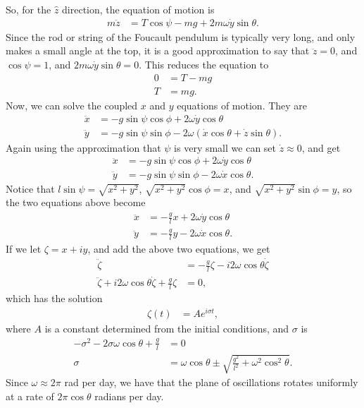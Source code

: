 \documentclass[10pt]{article}
\begin{document}
So, for the $\hat z$ direction, the equation of motion is
\begin{align*}
  m\ddot z &= T\cos\psi - mg + 2m\omega\dot y\sin\theta.
\end{align*}
Since the rod or string of the Foucault pendulum is typically very long, and 
only makes a small angle at the top,
it is a good approximation to say that $\ddot z=0$, and $\cos\psi=1$, and
$2m\omega\dot y\sin\theta=0$.  This reduces the equation to
\begin{align*}
  0 &= T - mg\\
  T &= mg.
\end{align*}
Now, we can solve the coupled $x$ and $y$ equations of motion.  They are
\begin{align*}
  \ddot x &= -g\sin\psi\cos\phi + 2\omega\dot y\cos\theta\\
  \ddot y &= -g\sin\psi\sin\phi - 2\omega(\dot x\cos\theta + \dot z\sin\theta).
\end{align*}
Again using the approximation that $\psi$ is very small we can set $\dot z\approx0$, and get
\begin{align*}
  \ddot x &= -g\sin\psi\cos\phi + 2\omega\dot y\cos\theta\\
  \ddot y &= -g\sin\psi\sin\phi - 2\omega\dot x\cos\theta.
\end{align*}
Notice that $l\sin\psi=\sqrt{x^2+y^2}$, $\sqrt{x^2+y^2}\cos\phi = x$, and
$\sqrt{x^2+y^2}\sin\phi = y$, so the two equations above become
\begin{align*}
  \ddot x &= -\frac{g}{l}x + 2\omega\dot y\cos\theta\\
  \ddot y &= -\frac{g}{l}y - 2\omega\dot x\cos\theta.
\end{align*}
If we let $\zeta=x+iy$, and add the above two equations, we get
\begin{align*}
  \ddot \zeta &= -\frac{g}{l}\zeta - i2\omega\cos\theta\dot\zeta\\
  \ddot \zeta + i2\omega\cos\theta\dot\zeta +\frac{g}{l}\zeta &= 0,
\end{align*}
which has the solution 
\begin{align*}
  \zeta(t) &= A e^{i\sigma t},
\end{align*}
where $A$ is a constant determined from the initial conditions, and $\sigma$ is
\begin{align*}
  -\sigma^2-2\sigma\omega\cos\theta+\frac{g}{l} &= 0\\
  \sigma &= \omega\cos\theta\pm\sqrt{\frac{g^2}{l^2}+\omega^2\cos^2\theta}.
\end{align*}
Since $\omega\approx2\pi$ rad per day, we have that the plane of oscillations 
rotates uniformly at a rate of $2\pi\cos\theta$ radians per day.
\end{document}
